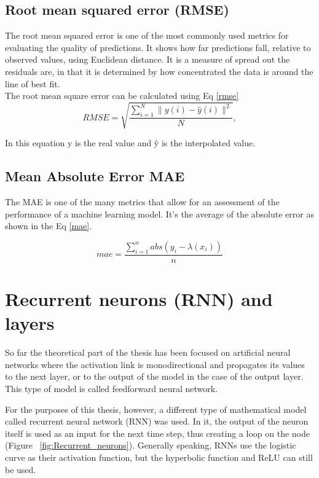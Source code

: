 \subsection{Root mean squared error (RMSE)}
The root mean squared error \autocite{12} is one of the most commonly used metrics for evaluating the quality of predictions. It shows how far predictions fall, relative to observed values, using Euclidean distance. It is a measure of spread out the residuals are, in that it is determined by how concentrated the data is around the line of best fit.
\\The root mean square error can be calculated using Eq \eqref{rmse}
\begin{equation}
R M S E=\sqrt{\frac{\sum_{i=1}^{N}\|y(i)-\hat{y}(i)\|^{2}}{N}},
\label{rmse}
\end{equation}

In this equation y is the real value and ŷ  is the interpolated value.

\subsection{Mean Absolute Error MAE}
The MAE is one of the many metrics that allow for an assessment of the performance  of a machine learning model. It’s the average of the absolute error as shown in the Eq \eqref{mae}.

\begin{equation}
m a e=\frac{\sum_{i=1}^{n} a b s\left(y_{i}-\lambda\left(x_{i}\right)\right)}{n}
\label{mae}
\end{equation}

\clearpage

\section{Recurrent neurons (RNN) and layers}
So far the theoretical part of the thesis has been focused on artificial neural networks where the activation link is monodirectional and propagates its values to the next layer, or to the output of the model in the case of the output layer. This type of model is called feedforward neural network.

For the purposes of this thesis, however, a different type of mathematical model called recurrent neural network (RNN) was used. In it, the output of the neuron itself is used as an input for the next time step, thus creating a loop on the node (Figure ~\ref{fig:Recurrent_neurons}).
Generally speaking, RNNs use the logistic curve as their activation function, but the hyperbolic function and ReLU can still be used.

